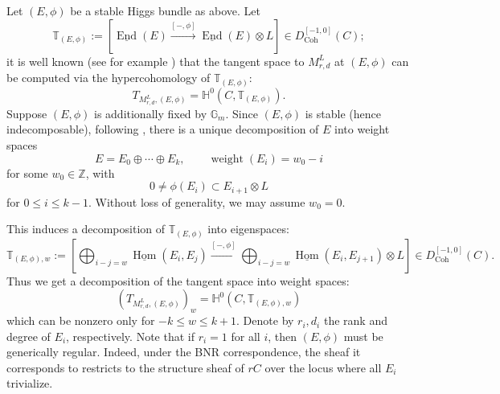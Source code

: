 \documentclass{amsart}
\theoremstyle{plain}
\theoremstyle{definition}
\theoremstyle{remark}
\begin{document}
Let $(E, \phi)$ be a stable Higgs bundle as above. Let 
\[\mathbb{T}_{(E,\phi)}:= [\underline{\operatorname{End}}(E) \xrightarrow{[-,\phi]}\underline{\operatorname{End}}(E)\otimes L]\in D^{[-1,0]}_{\operatorname{Coh}}(C);\]
it is well known (see for example \cite{Biswas1994AnIS}) that the tangent space to $M_{r,d}^L$ at $(E,\phi)$ can be computed via the hypercohomology of $\mathbb{T}_{(E,\phi)}$:
\[T_{M_{r,d}^L, (E,\phi)} = \mathbb{H}^0(C, \mathbb{T}_{(E,\phi)}).\]
Suppose $(E,\phi)$ is additionally fixed by $\mathbb{G}_m$.
Since $(E,\phi)$ is stable (hence indecomposable), following \cite[\S3.1]{HH}, there is a unique decomposition of $E$ into weight spaces
\begin{equation}\label{eq:bundledecomposition}
    E = E_0 \oplus \cdots \oplus E_k, \qquad \operatorname{weight}(E_i) = w_0-i
\end{equation}
for some $w_0\in\mathbb Z$, with
\[0\neq \phi(E_i)\subset E_{i+1}\otimes L\]
for $0\le i\le k-1$.
Without loss of generality, we may assume $w_0=0$.

This induces a decomposition of $\mathbb{T}_{(E,\phi)}$ into eigenspaces:
\[\mathbb{T}_{(E,\phi),w}:= \left[\bigoplus_{i-j=w}\underline{\operatorname{Hom}}(E_i, E_j) \xrightarrow{[-,\phi]}\bigoplus_{i-j=w}\underline{\operatorname{Hom}}(E_i, E_{j+1})\otimes L\right] \in D_{\operatorname{Coh}}^{[-1,0]}(C).\]
Thus we get a decomposition of the tangent space into weight spaces:
\begin{equation}\label{eq:tangentdecomposition}
    (T_{M_{r,d}^L, (E,\phi)})_w = \mathbb{H}^0(C, \mathbb{T}_{(E,\phi),w})
\end{equation}
which can be nonzero only for $-k\le w \le k+1$. Denote by $r_i, d_i$ the rank and degree of $E_i$, respectively.
Note that if $r_i=1$ for all $i$, then $(E,\phi)$ must be generically regular.
Indeed, under the BNR correspondence, the sheaf it corresponds to restricts to the structure sheaf of $rC$ over the locus where all $E_i$ trivialize.
\end{document}
